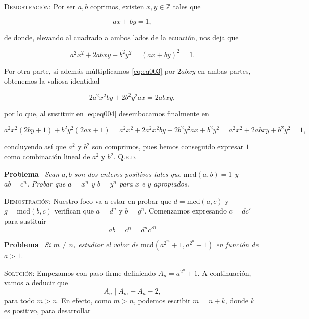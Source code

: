 \documentclass{article}
\newcommand{\mcd}{\text{mcd}}
\begin{document}
\noindent\textsc{Demostración}: Por ser $a, b$ coprimos, existen $x, y \in \mathbb{Z}$ tales que

\begin{equation}
    ax + by = 1
    \label{eq:eq003},
\end{equation}

\noindent de donde, elevando al cuadrado a ambos lados de la ecuación, nos deja que

\begin{equation}
    a^2x^2 + 2abxy + b^2y^2 = (ax + by)^2 = 1.
    \label{eq:eq004}
\end{equation}

\noindent Por otra parte, si además múltiplicamos \eqref{eq:eq003} por $2abxy$ en ambas partes, obtenemos la valiosa identidad

\[2a^2x^2by + 2b^2y^2ax = 2abxy,\]

\noindent por lo que, al sustituir en \eqref{eq:eq004} desembocamos finalmente en 

\[a^2x^2(2by + 1) + b^2y^2(2ax + 1) = a^2x^2 + 2a^2x^2by + 2b^2y^2ax + b^2y^2 = a^2x^2 + 2abxy + b^2y^2 = 1,\]

\noindent concluyendo así que $a^2$ y $b^2$ son comprimos, pues hemos conseguido expresar $1$ como combinación lineal de $a^2$ y $b^2$. \hfill{\textsc{Q.e.d.}}

\vspace{15px}

\noindent \textbf{Problema} \, \textit{Sean $a, b$ son dos enteros positivos tales que $\mcd(a, b) = 1$ y $ab = c^n$. Probar que $a = x^n$ y $b = y^n$ para $x$ e $y$ apropiados.}

\vspace{5px}

\noindent \textsc{Demostración}: Nuestro foco va a estar en probar que $d = \mcd(a, c)$ y $g = \mcd(b, c)$ verifican que $a = d^n$ y $b = g^n$. Comenzamos expresando $c = dc'$ para sustituir \[ab = c^n = d^nc'^n\]

\vspace{12px}

\noindent \textbf{Problema} \, \textit{Si $m \neq n$, estudiar el valor de $\mcd(a^{2^m} + 1, a^{2^n} + 1)$ en función de $a > 1$.}

\vspace{5px}

\noindent \textsc{Solución}: Empezamos con paso firme definiendo $A_n = a^{2^n} + 1$. A continuación, vamos a deducir que \[A_n \mid A_m + A_n - 2,\] para todo $m > n$. En efecto, como $m > n$, podemos escribir $m = n + k$, donde $k$ es positivo, para desarrollar
\end{document}
